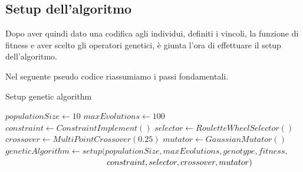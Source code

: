 \documentclass[a4paper, 11pt, oneside]{report}
\begin{document}
                \subsection{Setup dell'algoritmo}
                Dopo aver quindi dato una codifica agli individui, definiti i vincoli, la funzione di fitness e aver
                scelto gli operatori genetici, è giunta l'ora di effettuare il setup dell'algoritmo.
                \par \noindent Nel seguente pseudo codice riassumiamo i passi fondamentali.
                \medskip
                \begin{algorithm}
                \caption{Setup genetic algorithm}
                    \label{setup:ga}
                    \begin{algorithmic}[1]
                        \State $populationSize \gets 10$
                        \State $maxEvolutions \gets 100$
                        \State
                        \State $constraint \gets ConstraintImplement()$
                        \State $selector \gets RouletteWheelSelector()$
                        \State $crossover \gets MultiPointCrossover(0.25)$
                        \State $mutator \gets GaussianMutator()$
                        \State
                        \State $geneticAlgorithm \gets setup(populationSize, maxEvolutions, genotype, fitness,$
                        \State $\hspace*{12.3em} constraint, selector, crossover, mutator)$
                    \end{algorithmic}
                \end{algorithm}

            \newpage
\end{document}
